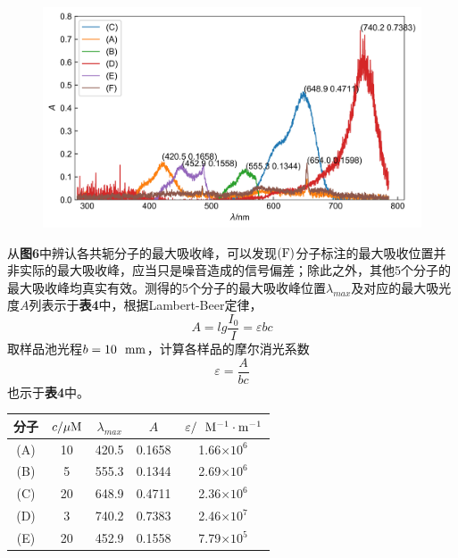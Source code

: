 \documentclass[12pt]{article}
\begin{document}
 \begin{figure}[h]
	\centering
	\includegraphics[width=1\textwidth]{6.jpg}
\end{figure}
\par 
从\textbf{图6}中辨认各共轭分子的最大吸收峰，可以发现${\rm (F)}$分子标注的最大吸收位置并非实际的最大吸收峰，应当只是噪音造成的信号偏差；除此之外，其他5个分子的最大吸收峰均真实有效。测得的5个分子的最大吸收峰位置$\lambda_{max}$及对应的最大吸光度$A$列表示于\textbf{表4}中，根据Lambert-Beer定律，
$$
A=lg\frac{I_{0}}{I}=\varepsilon bc
$$
取样品池光程$b=10\ \ {\rm mm}$，计算各样品的摩尔消光系数
$$\varepsilon=\frac{A}{bc}
$$也示于\textbf{表4}中。

\begin{table}[h]
	\centering
	\begin{tabular}{ccccc}
		\toprule
		分子 & $c/\mu{\rm M}$ & $\lambda_{max}$ & $A$ & $\varepsilon/{\rm \ \ M^{-1}\cdot m^{-1}}$  \\
		\midrule
		(A) & 10 & 420.5 & 0.1658 & 1.66$\times 10^{6}$ \\
		(B) & 5 & 555.3 & 0.1344 & 2.69$\times 10^{6}$ \\
		(C) & 20 & 648.9 & 0.4711 & 2.36$\times 10^{6}$ \\
		(D) & 3 & 740.2 & 0.7383 & 2.46$\times 10^{7}$ \\
		(E) & 20 & 452.9 & 0.1558 & 7.79$\times 10^{5}$ \\
		\bottomrule
	\end{tabular}
\end{table}
\par
\end{document}
